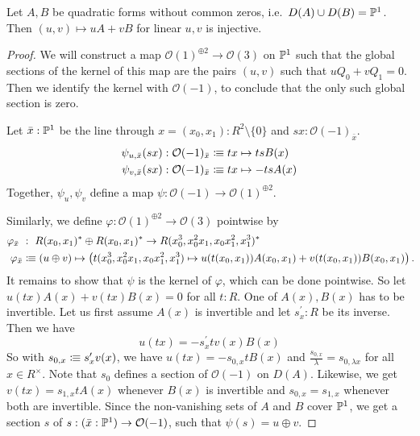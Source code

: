 \begin{lemma}
  \label{quadratic-forms-injective}
  Let \(A,B\) be quadratic forms without common zeros, i.e.\ \(D(A)\cup D(B)=\mathbb{P}^1\).
  Then \((u,v)\mapsto uA+vB\) for linear \(u,v\) is injective.
\end{lemma}

\begin{proof}
  We will construct a map \(\mathcal O(1)^{\oplus 2}\to \mathcal O(3)\) on \(\mathbb{P}^1\)
  such that the global sections of the kernel of this map are the pairs \((u,v)\)
  such that \(uQ_0+vQ_1=0\). Then we identify the kernel with \(\mathcal O(-1)\),
  to conclude that the only such global section is zero.
  
  Let \(\bar{x}:\mathbb{P}^1\) be the line through \(x=(x_0,x_1):R^2\setminus\{0\}\) and \(sx:\mathcal O(-1)_{\bar{x}}\).
  \begin{align*}
    \psi_{u,\bar{x}}(sx):\mathcal O(-1)_{\bar{x}}&\vcentcolon\mspace{-1.2mu}\equiv tx \mapsto tsB(x) \\
    \psi_{v,\bar{x}}(sx):\mathcal O(-1)_{\bar{x}}&\vcentcolon\mspace{-1.2mu}\equiv tx \mapsto -tsA(x) 
  \end{align*}
  Together, \(\psi_u,\psi_v\) define a map \(\psi:\mathcal O(-1)\to \mathcal O(1)^{\oplus 2}\).

  Similarly, we define \(\varphi:\mathcal O(1)^{\oplus 2}\to \mathcal O(3)\) pointwise by
  \begin{align*}
    \varphi_{\bar{x}}\ &:\  R(x_0,x_1)^\ast\oplus R(x_0,x_1)^\ast \to R(x_0^3,x_0^2x_1,x_0x_1^2,x_1^3)^\ast \\
    \varphi_{\bar{x}}&\colonequiv (u\oplus v)\mapsto \left(t(x_0^3,x_0^2x_1,x_0x_1^2,x_1^3)\mapsto u(t(x_0,x_1))A(x_0,x_1)+v(t(x_0,x_1))B(x_0,x_1)\right)\rlap{.}
  \end{align*}
  It remains to show that \(\psi\) is the kernel of \(\varphi\), which can be done pointwise.
  So let \(u(tx)A(x)+v(tx)B(x)=0\) for all \(t:R\).
  One of \(A(x),B(x)\) has to be invertible.
  Let us first assume \(A(x)\) is invertible and let \(s^\prime_x:R\) be its inverse.
  Then we have \[
    u(tx)=-s^\prime_x tv(x)B(x)
  \]
  So with \(s_{0,x}\vcentcolon\mspace{-1.2mu}\equiv s^\prime_x v(x) \), we have \(u(tx)=-s_{0,x}tB(x)\) and \(\frac{s_{0,x}}{\lambda}=s_{0,\lambda x}\) for all \(x\in R^\times\).
  Note that \(s_{0}\) defines a section of \(\mathcal O(-1)\) on \(D(A)\).
  Likewise, we get \(v(tx)=s_{1,x}tA(x)\) whenever \(B(x)\) is invertible
  and \(s_{0,x}=s_{1,x}\) whenever both are invertible.
  Since the non-vanishing sets of \(A\) and \(B\) cover \(\mathbb{P}^1\), we get a section \(s\) of
  \(s:(\bar{x}:\mathbb{P}^1)\to \mathcal O(-1)\), such that \(\psi(s)=u\oplus v\).
\end{proof}

